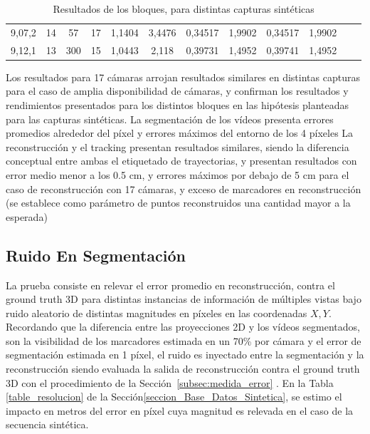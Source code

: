 \begin{table}[h]
{\begin{tabular}{cccc|c|c|c|c|c|c|ll}
\multicolumn{1}{|c|}{9,07,2}  & \multicolumn{1}{c|}{14}         & \multicolumn{1}{c|}{57}     & 17      & 1,1404 & 3,4476  & 0,34517     & 1,9902  & 0,34517     & 1,9902  &  &  \\ \cline{1-10}
\multicolumn{1}{|c|}{9,12,1}  & \multicolumn{1}{c|}{13}         & \multicolumn{1}{c|}{300}    & 15      & 1,0443 & 2,118   & 0,39731     & 1,4952  & 0,39741     & 1,4952  &  &  \\ \cline{1-10}
\end{tabular}
}
\caption{Resultados de los bloques, para distintas capturas sintéticas}
\label{resultados_distintas_capturas}
\end{table}

Los resultados para 17 cámaras arrojan resultados similares en distintas capturas para el caso de amplia disponibilidad de cámaras, y confirman los resultados y rendimientos presentados para los distintos bloques en las hipótesis planteadas para las capturas sintéticas. La segmentación de los vídeos presenta errores promedios alrededor del píxel y errores máximos del entorno de los 4 píxeles La reconstrucción y el tracking presentan resultados similares, siendo la diferencia conceptual entre ambas el etiquetado de trayectorias, y presentan resultados con error medio menor a los 0.5 cm, y errores máximos por debajo de 5 cm para el caso de reconstrucción con 17 cámaras, y exceso de marcadores en reconstrucción (se establece como parámetro de puntos reconstruidos una cantidad mayor a la esperada) 

\subsection{Ruido En Segmentación}

La prueba consiste en relevar el error promedio en reconstrucción, contra el ground truth 3D para distintas instancias de información de múltiples vistas bajo ruido aleatorio de distintas magnitudes en píxeles en las coordenadas $X,Y$. Recordando que la diferencia entre las proyecciones 2D y los vídeos segmentados, son la visibilidad de los marcadores estimada en un 70\% por cámara y el error de segmentación estimada en 1 píxel, el ruido es inyectado entre la segmentación y la reconstrucción siendo evaluada la salida de reconstrucción contra el ground truth 3D con el procedimiento de la Sección~\ref{subsec:medida_error} . En la Tabla \ref{table_resolucion} de la Sección\ref{seccion_Base_Datos_Sintetica}, se estimo el impacto en metros del error en píxel cuya magnitud es relevada en el caso de la secuencia sintética.

